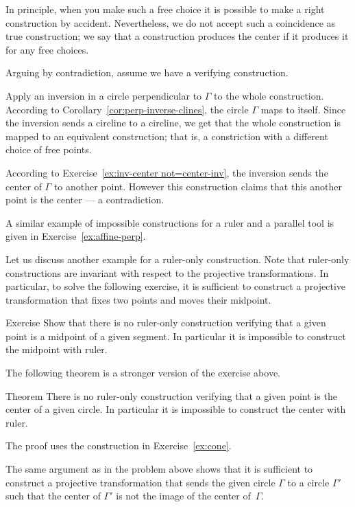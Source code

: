 In principle, when you make such a free choice it is possible to make a right construction by accident.
Nevertheless, we do not accept such a coincidence as true construction; 
we say that a construction produces the center if it produces it for any free choices.


\label{page:solution-for-ex:circumtool}
Arguing by contradiction, 
assume we have a verifying construction. 

Apply an inversion in a circle perpendicular to $\Gamma$ to the whole construction.
According to Corollary~\ref{cor:perp-inverse-clines},
the circle
$\Gamma$ maps to itself.
Since the inversion sends a circline to a circline, we get that the whole  construction is mapped to an equivalent construction; 
that is, a constriction with a different choice of free points.

According to Exercise~\ref{ex:inv-center not=center-inv}, 
the inversion sends the center of $\Gamma$ to another point.
However this construction claims that this another point is the center --- a contradiction.
\qeds

A similar example of impossible constructions for a ruler and a parallel tool
 is given in Exercise~\ref{ex:affine-perp}.
 
Let us discuss another example for a ruler-only construction.
Note that ruler-only constructions are invariant with respect to the projective transformations. 
In particular, to solve the following exercise, it is sufficient to construct a projective transformation that fixes two points and moves their midpoint.

\begin{thm}{Exercise}\label{ex:midpoint-proj}
Show that there is no ruler-only construction verifying that a given point is a  midpoint of a given segment.
In particular it is impossible to construct the midpoint with ruler.
\end{thm}

The following theorem is a stronger version of the exercise above.

\begin{thm}{Theorem}\label{thm:circle-center-proj}
There is no ruler-only construction verifying that a given point is the center of a given circle.
In particular it is impossible to construct the center with ruler.
\end{thm}

The proof uses the construction in Exercise~\ref{ex:cone}.

The same argument as in the problem above shows that 
it is sufficient to construct a projective transformation 
that sends the given circle $\Gamma$ to a circle $\Gamma'$ such that the center of $\Gamma'$ is not the image of the center of~$\Gamma$.

